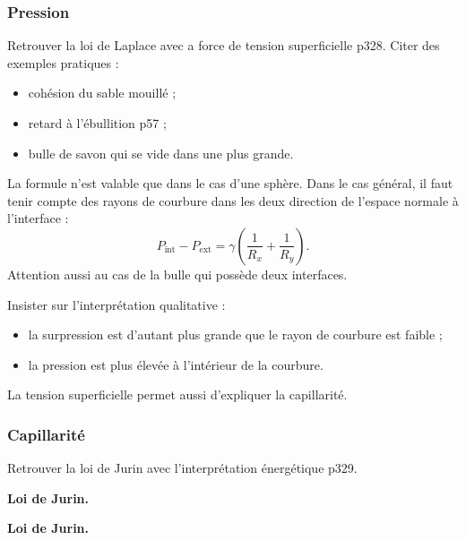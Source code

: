 \subsubsection{Pression}

Retrouver la loi de Laplace avec a force de tension superficielle \cite{Sanz2016} p328.
Citer des exemples pratiques :
\begin{itemize}
\item cohésion du sable mouillé ;
\item retard à l'ébullition \cite{Guyon2001} p57 ;
\item bulle de savon qui se vide dans une plus grande.
\end{itemize}

\begin{remarque}
La formule n'est valable que dans le cas d'une sphère.
Dans le cas général, il faut tenir compte des rayons de courbure dans les deux direction de l'espace normale à l'interface :
\begin{equation}
P_\mathrm{int} - P_\mathrm{ext} = \gamma \left( \frac{1}{R_x} + \frac{1}{R_y} \right).
\end{equation}
Attention aussi au cas de la bulle qui possède deux interfaces.
\end{remarque}

Insister sur l'interprétation qualitative :
\begin{itemize}
\item la surpression est d'autant plus grande que le rayon de courbure est faible ;
\item la pression est plus élevée à l'intérieur de la courbure.
\end{itemize}

\begin{transition}
La tension superficielle permet aussi d'expliquer la capillarité.
\end{transition}

\subsubsection{Capillarité}

Retrouver la loi de Jurin avec l'interprétation énergétique \cite{Sanz2016} p329.

\begin{slide}
\textbf{Loi de Jurin.}
\end{slide}

\begin{experience}
\textbf{Loi de Jurin.}
\end{experience}

